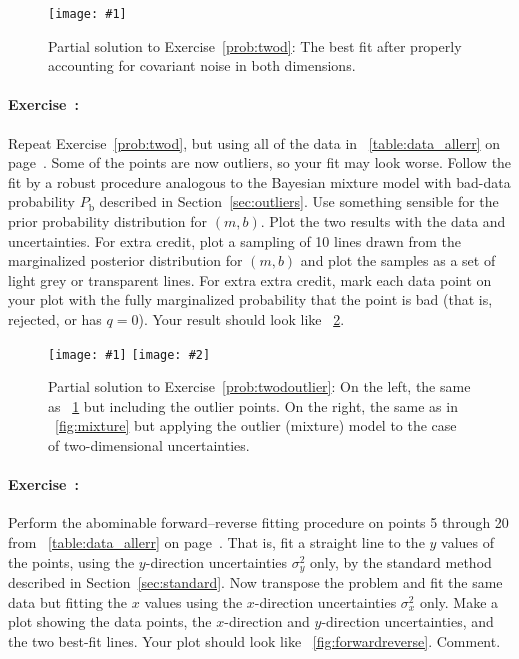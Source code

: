 \documentclass[12pt,twoside,pdftex]{article}
\newcommand{\exampleplot}[1]{%
\begin{center}%
\texttt{[image: \#1]}%
\end{center}%
}
\newcommand{\exampleplottwo}[2]{%
\begin{center}%
\texttt{[image: \#1]}%
\texttt{[image: \#2]}%
\end{center}%
}
\newcommand{\sectionname}{Section}
\newcommand{\problemname}{Exercise}
\newcounter{problem}
\newenvironment{problem}{\paragraph{\problemname~\theproblem:}\refstepcounter{problem}}{}
\newcommand{\Pbad}{P_{\mathrm{b}}}
\begin{document}
\begin{figure}[htbp]
\exampleplot{ex12}
\caption{Partial solution to \problemname~\ref{prob:twod}: The best
fit after properly accounting for covariant noise in both
dimensions.}\label{fig:twod}
\end{figure}

\begin{problem}\label{prob:twodoutlier}
Repeat \problemname~\ref{prob:twod}, but using all of the data in
\tablename~\ref{table:data_allerr} on
page~\pageref{table:data_allerr}.  Some of the points are now
outliers, so your fit may look worse.  Follow the fit by a robust
procedure analogous to the Bayesian mixture model with bad-data
probability $\Pbad$ described in \sectionname~\ref{sec:outliers}.  Use
something sensible for the prior probability distribution for $(m,b)$.
Plot the two results with the data and uncertainties.  For extra
credit, plot a sampling of 10 lines drawn from the marginalized
posterior distribution for $(m,b)$ and plot the samples as a set of
light grey or transparent lines.  For extra extra credit, mark each
data point on your plot with the fully marginalized probability that
the point is bad (that is, rejected, or has $q=0$).  Your result
should look like \figurename~\ref{fig:twodoutlier}.
\end{problem}

\begin{figure}[htbp]
\exampleplottwo{ex13a}{ex13b}
\caption{Partial solution to \problemname~\ref{prob:twodoutlier}: On
the left, the same as \figurename~\ref{fig:twod} but including the
outlier points.  On the right, the same as in
\figurename~\ref{fig:mixture} but applying the outlier (mixture) model
to the case of two-dimensional uncertainties.}\label{fig:twodoutlier}
\end{figure}

\begin{problem}\label{prob:forwardreverse}
Perform the abominable forward--reverse fitting procedure on points 5
through 20 from \tablename~\ref{table:data_allerr} on
page~\pageref{table:data_allerr}.  That is, fit a straight line to the
$y$ values of the points, using the $y$-direction uncertainties
$\sigma_y^2$ only, by the standard method described in
\sectionname~\ref{sec:standard}.  Now transpose the problem and fit
the same data but fitting the $x$ values using the $x$-direction
uncertainties $\sigma_x^2$ only.  Make a plot showing the data points,
the $x$-direction and $y$-direction uncertainties, and the two
best-fit lines.  Your plot should look like
\figurename~\ref{fig:forwardreverse}.  Comment.
\end{problem}
\end{document}
